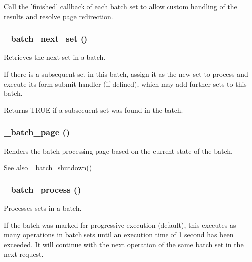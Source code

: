 Call the 'finished' callback of each batch set to allow custom handling of the results and resolve page redirection. \hypertarget{batch_8inc_a48dd7f59b745d8e01fce39996d0c826e}{
\subsubsection[{\_\-batch\_\-next\_\-set}]{\setlength{\rightskip}{0pt plus 5cm}\_\-batch\_\-next\_\-set ()}}
\label{batch_8inc_a48dd7f59b745d8e01fce39996d0c826e}
Retrieves the next set in a batch.

If there is a subsequent set in this batch, assign it as the new set to process and execute its form submit handler (if defined), which may add further sets to this batch.

\begin{DoxyReturn}{Returns}
TRUE if a subsequent set was found in the batch. 
\end{DoxyReturn}
\hypertarget{batch_8inc_a5535c7cfeae572bda2c11f3e597a55b6}{
\subsubsection[{\_\-batch\_\-page}]{\setlength{\rightskip}{0pt plus 5cm}\_\-batch\_\-page ()}}
\label{batch_8inc_a5535c7cfeae572bda2c11f3e597a55b6}
Renders the batch processing page based on the current state of the batch.

\begin{DoxySeeAlso}{See also}
\hyperlink{batch_8inc_a85d830f44fb762da6e9fdb838180c85f}{\_\-batch\_\-shutdown()} 
\end{DoxySeeAlso}
\hypertarget{batch_8inc_af411ff0cae660684809c5f6a8dbc0353}{
\subsubsection[{\_\-batch\_\-process}]{\setlength{\rightskip}{0pt plus 5cm}\_\-batch\_\-process ()}}
\label{batch_8inc_af411ff0cae660684809c5f6a8dbc0353}
Processes sets in a batch.

If the batch was marked for progressive execution (default), this executes as many operations in batch sets until an execution time of 1 second has been exceeded. It will continue with the next operation of the same batch set in the next request.

